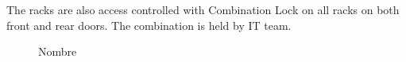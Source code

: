  \newpage

The racks are also access controlled with Combination Lock on all racks on both front and rear doors. The combination is held by IT team.

\begin{figure}
    \centering
    \caption*{Nombre}
  \end{figure}

  \newpage